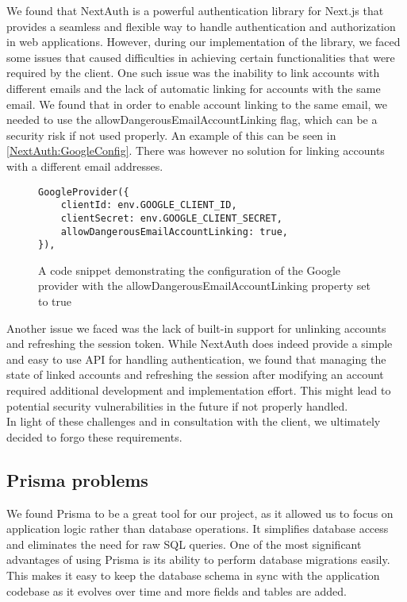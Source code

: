 We found that NextAuth is a powerful authentication library for Next.js that provides a seamless and flexible way to handle authentication and authorization in web applications. However, during our implementation of the library, we faced some issues that caused difficulties in achieving certain functionalities that were required by the client. One such issue was the inability to link accounts with different emails and the lack of automatic linking for accounts with the same email. We found that in order to enable account linking to the same email, we needed to use the allowDangerousEmailAccountLinking flag, which can be a security risk if not used properly. An example of this can be seen in \autoref{NextAuth:GoogleConfig}. There was however no solution for linking accounts with a different email addresses. \\

\begin{figure}[h]
\lstset{basicstyle=\ttfamily\small}
\begin{lstlisting}
GoogleProvider({
    clientId: env.GOOGLE_CLIENT_ID,
    clientSecret: env.GOOGLE_CLIENT_SECRET,
    allowDangerousEmailAccountLinking: true,
}),
\end{lstlisting}
\caption[Google provider configuration]{A code snippet demonstrating the configuration of the Google provider with the allowDangerousEmailAccountLinking property set to true}
\label{NextAuth:GoogleConfig}
\end{figure}

\noindent
Another issue we faced was the lack of built-in support for unlinking accounts and refreshing the session token. While NextAuth does indeed provide a simple and easy to use API for handling authentication, we found that managing the state of linked accounts and refreshing the session after modifying an account required additional development and implementation effort. This might lead to potential security vulnerabilities in the future if not properly handled. \\

\noindent
In light of these challenges and in consultation with the client, we ultimately decided to forgo these requirements.

\subsection{Prisma problems}

We found Prisma to be a great tool for our project, as it allowed us to focus on application logic rather than database operations. It simplifies database access and eliminates the need for raw SQL queries. One of the most significant advantages of using Prisma is its ability to perform database migrations easily. This makes it easy to keep the database schema in sync with the application codebase as it evolves over time and more fields and tables are added. \\

